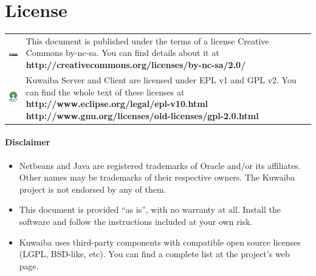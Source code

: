 \documentclass[a4paper]{article}
\begin{document}
	\section{License}
		\begin{table}[ht]
			\centering
			\begin{tabular}{cp{10cm}}
				
				\includegraphics[]{img/cc_license_logo.jpg} & This document is published under the terms of a license Creative Commons by-nc-sa. You can find details about it at\linebreak
				\textbf{http://creativecommons.org/licenses/by-nc-sa/2.0/ } \\

				\includegraphics[width=2cm]{img/osi_logo.jpg} & Kuwaiba Server and Client are licensed under EPL v1 and GPL v2. You can find the whole text of these licenses at \linebreak
				\textbf{http://www.eclipse.org/legal/epl-v10.html} \linebreak
				\textbf{http://www.gnu.org/licenses/old-licenses/gpl-2.0.html} \\
			\end{tabular}
		\end{table}
		\paragraph{Disclaimer} \hspace{0pt}
		\begin{itemize}
			\item Netbeans and Java are registered trademarks of Oracle and/or its affiliates. Other names may be trademarks of their respective owners. The Kuwaiba project is not endorsed by any of them.
			
			\item This document is provided “as is”, with no warranty at all. Install the software and follow the instructions included at your own risk.
			
			\item Kuwaiba uses third-party components with compatible open source licenses (LGPL, BSD-like, etc). You can find a complete list at the project's web page.
		\end{itemize}
	
\end{document}
